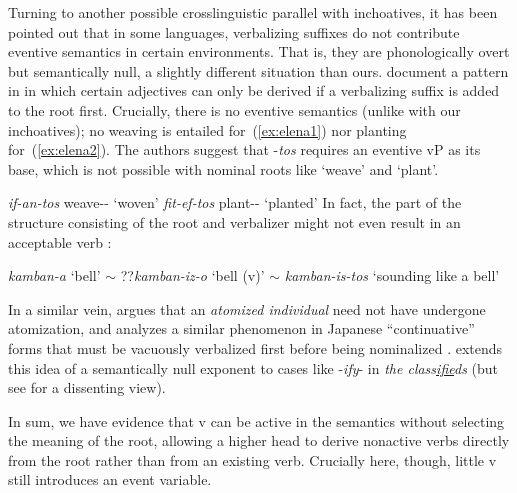 \begin{exe}
\begin{xlist}
\begin{xlist}
\begin{exe}
\begin{xlist}
\begin{xlist}
\begin{exe}
\begin{xlist}
\begin{xlist}
\begin{exe}
\begin{exe}
\begin{xlist}
\begin{exe}
\begin{exe}
\begin{xlist}
\begin{exe}
\begin{exe}
\begin{exe}
\begin{exe}
\begin{exe}
\begin{xlist}
\begin{exe}
\begin{xlist}
\begin{exe}
\begin{exe}
\begin{xlist}
\begin{exe}
\begin{xlist}
\begin{exe}
\begin{exe}
\begin{exe}
\begin{xlist}
\begin{exe}
\begin{exe}
\begin{exe}
\begin{xlist}
\begin{exe}
\begin{xlist}
\begin{exe}
\begin{xlist}
\begin{exe}
\begin{xlist}
Turning to another possible crosslinguistic parallel with inchoatives, it has been pointed out that in some languages, verbalizing suffixes do not contribute eventive semantics in certain environments. That is, they are phonologically overt but semantically null, a slightly different situation than ours. \citet{elenasamioti13,elenasamioti14} document a pattern in  in which certain adjectives can only be derived if a verbalizing suffix is added to the root first. Crucially, there is no eventive semantics (unlike with our inchoatives); no weaving is entailed for~(\ref{ex:elena1}) nor planting for~(\ref{ex:elena2}). {The authors suggest that -\emph{tos} requires an eventive vP as its base, which is not possible with nominal roots like `weave' and `plant'.}
 \begin{exe}
\ex  \label{ex:elena1} \emph{if-an-tos} weave-- `woven' 
\ex  \label{ex:elena2} \emph{fit-ef-tos} plant-- `planted' \hfill \citep[97]{elenasamioti14} 
 \z 
In fact, the part of the structure consisting of the root and verbalizer might not even result in an acceptable verb \citep[100]{elenasamioti14}:
 \begin{exe}
\ex  \emph{kamban-a} `bell' $\sim$ ??\emph{kamban-iz-o} `bell (v)' $\sim$ \emph{kamban-is-tos} `sounding like a bell' 
 \z 

In a similar vein, \cite{marantz13} argues that an \emph{atomized individual} need not have undergone atomization, and analyzes a similar phenomenon in Japanese ``continuative'' forms that must be vacuously verbalized first{ before being nominalized} \citep{volpe05}. \cite{anagnostopoulou14thli} extends this idea of a semantically null exponent to cases like -\emph{ify}- in \emph{the class\underline{ifie}ds} (but see \citealt{borer14lingua} for a dissenting view).

In sum, we have evidence that v can be active in the semantics without selecting the meaning of the root, allowing a higher {\vz} head to derive nonactive verbs directly from the root rather than from an existing verb. Crucially here, though, little v still introduces an event variable.

	

\end{exe}
\end{exe}
\end{xlist}
\end{exe}
\end{xlist}
\end{exe}
\end{xlist}
\end{exe}
\end{xlist}
\end{exe}
\end{exe}
\end{exe}
\end{xlist}
\end{exe}
\end{exe}
\end{exe}
\end{xlist}
\end{exe}
\end{xlist}
\end{exe}
\end{exe}
\end{xlist}
\end{exe}
\end{xlist}
\end{exe}
\end{exe}
\end{exe}
\end{exe}
\end{exe}
\end{xlist}
\end{exe}
\end{exe}
\end{xlist}
\end{exe}
\end{exe}
\end{xlist}
\end{xlist}
\end{exe}
\end{xlist}
\end{xlist}
\end{exe}
\end{xlist}
\end{xlist}
\end{exe}
